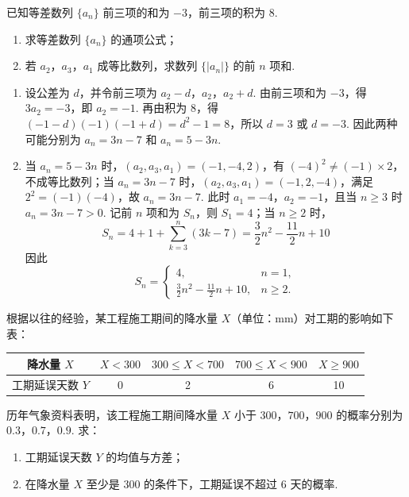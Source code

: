 \begin{problem}
已知等差数列 \(\{a_{n}\}\) 前三项的和为 \(-3\)，前三项的积为 \(8\).

\begin{enumerate}
\item 求等差数列 \(\{a_{n}\}\) 的通项公式；
\item 若 \(a_{2}\)，\(a_{3}\)，\(a_{1}\) 成等比数列，求数列 \(\{|a_{n}|\}\) 的前 \(n\) 项和.
\end{enumerate}
\end{problem}

\begin{solution}
\begin{enumerate}
\item 设公差为 \(d\)，并令前三项为 \(a_2-d\)，\(a_2\)，\(a_2+d\). 由前三项和为 \(-3\)，得 \(3a_2=-3\)，即 \(a_2=-1\). 再由积为 \(8\)，得 \((-1-d)(-1)(-1+d)=d^2-1=8\)，所以 \(d=3\) 或 \(d=-3\). 因此两种可能分别为 \(a_n=3n-7\) 和 \(a_n=5-3n\).
\item 当 \(a_n=5-3n\) 时，\((a_2,a_3,a_1)=(-1,-4,2)\)，有 \((-4)^2\neq(-1)\times2\)，不成等比数列；当 \(a_n=3n-7\) 时，\((a_2,a_3,a_1)=(-1,2,-4)\)，满足 \(2^2=(-1)(-4)\)，故 \(a_n=3n-7\). 此时 \(a_1=-4\)，\(a_2=-1\)，且当 \(n\geqslant3\) 时 \(a_n=3n-7>0\). 记前 \(n\) 项和为 \(S_n\)，则 \(S_1=4\)；当 \(n\geqslant2\) 时，
\[
S_n=4+1+\sum_{k=3}^{n}(3k-7)=\frac32n^2-\frac{11}{2}n+10
\]
因此
\[
S_n=\begin{cases}
4, & n=1,\\
\frac32n^2-\frac{11}{2}n+10, & n\geqslant2.
\end{cases}
\]
\end{enumerate}
\end{solution}

\setcounter{probnum}{19}
\begin{problem}
根据以往的经验，某工程施工期间的降水量 \(X\)（单位：\(\mathrm{mm}\)）对工期的影响如下表：

\begin{center}
\begin{tabular}{c|cccc}
降水量 \(X\) & \(X < 300\) & \(300 \leqslant X < 700\) & \(700 \leqslant X < 900\) & \(X \geqslant 900\) \\
\hline
工期延误天数 \(Y\) & 0 & 2 & 6 & 10
\end{tabular}
\end{center}

历年气象资料表明，该工程施工期间降水量 \(X\) 小于 \(300\)，\(700\)，\(900\) 的概率分别为 \(0.3\)，\(0.7\)，\(0.9\). 求：

\begin{enumerate}
\item 工期延误天数 \(Y\) 的均值与方差；
\item 在降水量 \(X\) 至少是 \(300\) 的条件下，工期延误不超过 \(6\) 天的概率.
\end{enumerate}
\end{problem}

